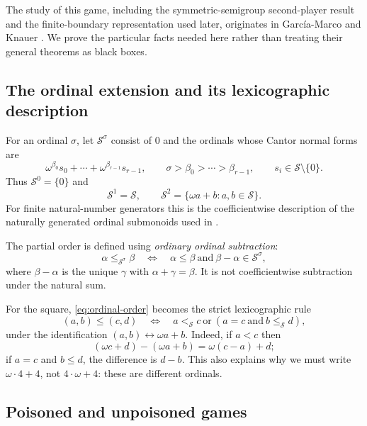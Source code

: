 \documentclass[11pt,letterpaper]{article}
\numberwithin{equation}{section}
\theoremstyle{definition}
\newcommand{\Sg}{\mathcal S}
\begin{document}
The study of this game, including the symmetric-semigroup second-player
result and the finite-boundary representation used later, originates in
Garc\'ia-Marco and Knauer \cite{GMK}. We prove the particular facts needed
here rather than treating their general theorems as black boxes.

\subsection{The ordinal extension and its lexicographic description}

For an ordinal $\sigma$, let $\Sg^\sigma$ consist of $0$ and the ordinals
whose Cantor normal forms are
\begin{equation}\label{eq:cnf}
 \omega^{\beta_0}s_0+\cdots+\omega^{\beta_{r-1}}s_{r-1},
 \qquad \sigma>\beta_0>\cdots>\beta_{r-1},\qquad
 s_i\in\Sg\setminus\{0\}.
\end{equation}
Thus $\Sg^0=\{0\}$ and
\[
 \Sg^1=\Sg,\qquad
 \Sg^2=\{\omega a+b:a,b\in\Sg\}.
\]
For finite natural-number generators this is the coefficientwise description
of the naturally generated ordinal submonoids used in
\cite{RiveroV1,RiveroV3}.

The partial order is defined using \emph{ordinary ordinal subtraction}:
\begin{equation}\label{eq:ordinal-order}
 \alpha\leq_{\Sg^\sigma}\beta
 \quad\Longleftrightarrow\quad
 \alpha\leq\beta\ \text{and}\ \beta-\alpha\in\Sg^\sigma,
\end{equation}
where $\beta-\alpha$ is the unique $\gamma$ with $\alpha+\gamma=\beta$.
It is not coefficientwise subtraction under the natural sum.

For the square, \cref{eq:ordinal-order} becomes the strict lexicographic
rule
\begin{equation}\label{eq:lex}
 (a,b)\leq(c,d)
 \quad\Longleftrightarrow\quad
 a<_{\Sg}c\ \text{or}\ (a=c\ \text{and}\ b\leq_{\Sg}d),
\end{equation}
under the identification $(a,b)\leftrightarrow\omega a+b$.
Indeed, if $a<c$ then
\[
 (\omega c+d)-(\omega a+b)=\omega(c-a)+d;
\]
if $a=c$ and $b\leq d$, the difference is $d-b$. This also explains why
we must write $\omega\cdot4+4$, not $4\cdot\omega+4$: these are different
ordinals.

\subsection{Poisoned and unpoisoned games}
\end{document}
